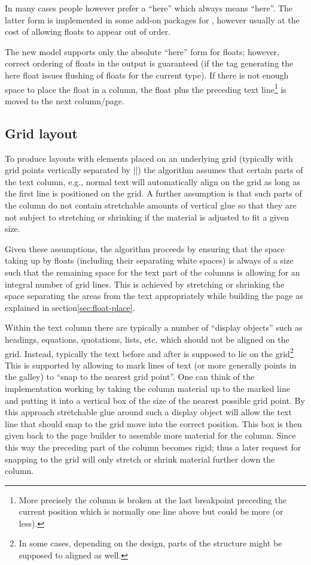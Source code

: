 \documentclass[twocolumn]{article}
\begin{document}
In many cases people however prefer a ``here'' which always means
``here''. The latter form is implemented in some add-on packages for
\LaTeXe{}, however usually at the cost of allowing floats to appear out
of order.

The new model supports only the absolute ``here'' form for floats;
however, correct ordering of floats in the output is guaranteed (if
the tag generating the here float issues flushing of floats for the
current type). If
there is not enough space to place the float in a column, the float
plus the preceding text line\footnote{More precisely the column is
broken at the last breakpoint preceding the current position which is
normally one line above but could be more (or less).} is moved to the
next column/\allowbreak page.

\subsection{Grid layout}
\ORspecial\ShowGridtrue

To produce layouts with elements placed on an underlying grid
(typically with grid points vertically separated by |\baselineskip|)
the algorithm assumes that certain parts of the text column, e.g.,
normal text will automatically align on the grid as long as the first
line is positioned on the grid. A further assumption is that such
parts of the column do not contain stretchable amounts of vertical
glue so that they are not subject to stretching or shrinking if the
material is adjusted to fit a given size.

Given these assumptions, the algorithm proceeds by ensuring that the
space taking up by floats (including their separating white spaces) is
always of a size such that the remaining space for the text part of the
columns is allowing for an integral number of grid lines. This is
achieved by stretching or shrinking the space separating the areas
from the text appropriately while building the page as explained in
section\vref{sec:float-place}.

Within the text column there are typically a number of ``display
objects'' such as headings, equations, quotations, lists, etc\@. which
should not be aligned on the grid. Instead, typically the text before
and after is supposed to lie on the grid\footnote{In some cases,
depending on the design, parts of the structure might be supposed to
aligned as well.} This is supported by allowing to mark lines of text
(or more generally points in the galley) to ``snap to the nearest grid
point''. One can think of the implementation working by taking the
column material up to the marked line and putting it into a vertical
box of the size of the nearest possible grid point. By this approach
stretchable glue around such a display object will allow the text line
that should snap to the grid move into the correct position. This box
is then given back to the page builder to assemble more material for
the column. Since this way the preceding part of the column becomes
rigid; thus a later request for snapping to the grid will only stretch
or shrink material further down the column.
\end{document}

